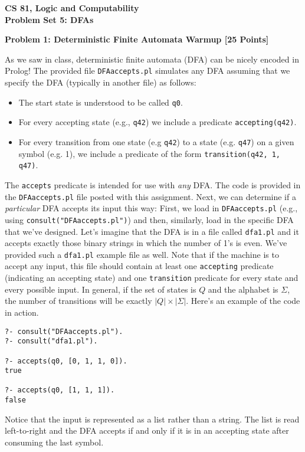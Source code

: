 \documentclass[12pt]{article}
\newcommand{\DoNotShare}{\large \noindent \textbf{Under the Harvey Mudd Honor Code, this document is not to be shared.} \normalsize}
\newcommand{\Problem}[3]{\mbox{} \newline \noindent \textbf{\textbf{Problem #1: #2 [#3 Points] \\ }}}
\begin{document}
\begin{center}
	\bf
	CS 81, Logic and Computability  \\
	Problem Set 5:  DFAs \\
\end{center}


\Problem{1}{Deterministic Finite Automata Warmup}{25}

As we saw in class, deterministic finite automata (DFA) can be nicely encoded in Prolog!  The provided file \verb+DFAaccepts.pl+ simulates any DFA assuming that we specify the DFA (typically in another file) as follows:
\begin{itemize}
	\item The start state is understood to be called \verb+q0+.  
	\item For every accepting state (e.g., \verb+q42+) we include a predicate \verb+accepting(q42)+.
	\item For every transition from one state (e.g \verb+q42+) to a state (e.g. \verb+q47+) on a given symbol (e.g. 1), we include a predicate of the form \verb+transition(q42, 1, q47)+.
\end{itemize}
The \verb+accepts+ predicate is intended for use with \emph{any} DFA.  The code is provided in the \verb+DFAaccepts.pl+ file posted with this assignment.
Next, we can determine if a \emph{particular} DFA accepts its input this way:  First, we load in \verb+DFAaccepts.pl+ (e.g., using \verb+consult("DFAaccepts.pl")+) and then, similarly, load in the specific 
DFA that we've designed.  Let's imagine that the DFA is in a file called \verb+dfa1.pl+ and it accepts exactly those binary strings in which the number of 1's is even.  We've provided such a \verb+dfa1.pl+ example file as well.  Note that if the machine is to accept any input, this file should contain at least one \verb+accepting+ predicate (indicating an accepting state) and one \verb+transition+ predicate for every state and every possible input.  In general, if the set of states is $Q$ and the alphabet is $\Sigma$, the number of transitions will be exactly $|Q| \times |\Sigma|$.  Here's an example of the code in action.
\begin{verbatim}
?- consult("DFAaccepts.pl").
?- consult("dfa1.pl").

?- accepts(q0, [0, 1, 1, 0]).
true

?- accepts(q0, [1, 1, 1]).
false
\end{verbatim}
Notice that the input is represented as a list rather than a string.  The list is read left-to-right and the DFA accepts if and only if it is in an accepting state after consuming the last symbol.
\end{document}
